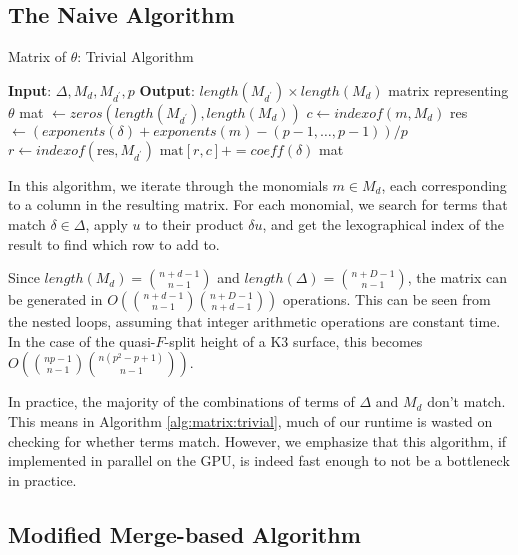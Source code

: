 \subsection{The Naive Algorithm}

\begin{algorithm}[H]
    \caption{Matrix of $\theta$: Trivial Algorithm}
    \label{alg:matrix:trivial}
    \begin{algorithmic}[1]
    \State \textbf{Input}: $\Delta, M_{d}, M_{d^{\prime}}, p$
    \State \textbf{Output}: $length(M_{d^{\prime}}) \times length(M_{d})$ 
	matrix representing $\theta$
    \State mat $\gets zeros(length(M_{d^{\prime}}), length(M_{d}))$
	    \State $c \gets indexof(m, M _{d})$
        \For{$\delta \in \Delta$}
			\State res $\gets (exponents(\delta) + exponents(m) - (p-1, \ldots, p-1)) / p$
				\State $r \gets indexof(\text{res},M_{d^{\prime}})$
                \State $\text{mat}[r, c] += coeff(\delta)$
            \EndIf
        \EndFor
    \EndFor
    \State \Return mat
    \end{algorithmic}
\end{algorithm}

In this algorithm, we iterate through the monomials $m \in M_{d}$, each corresponding to a column in the
resulting matrix. For each monomial, we search for terms that match $\delta \in \Delta$, apply $u$ to their product $\delta u$, and 
get the lexographical index of the result to find which row to add to.

Since $length(M_{d}) = \binom{n + d - 1}{n - 1}$ and 
$length(\Delta) = \binom{n + D - 1}{n - 1}$, the matrix can be generated in 
$O(\binom{n + d - 1}{n - 1}\binom{n + D - 1}{n + d - 1})$ operations. 
This can be
seen from the nested loops, assuming that integer arithmetic operations are constant time.
In the case of the quasi-\(F\)-split height of a K3 surface, 
this becomes
\(O(\binom{np - 1}{n-1}\binom{n(p^2 - p + 1)}{n-1})\).

In practice, the majority of the combinations of terms of $\Delta$ and $M_{d}$ don't match. This means in
Algorithm \ref{alg:matrix:trivial}, much of our runtime is wasted on checking for whether terms match. 
However, we emphasize that this algorithm, if implemented in parallel on the GPU, is indeed
fast enough to not be a bottleneck in practice.

\subsection{Modified Merge-based Algorithm}

